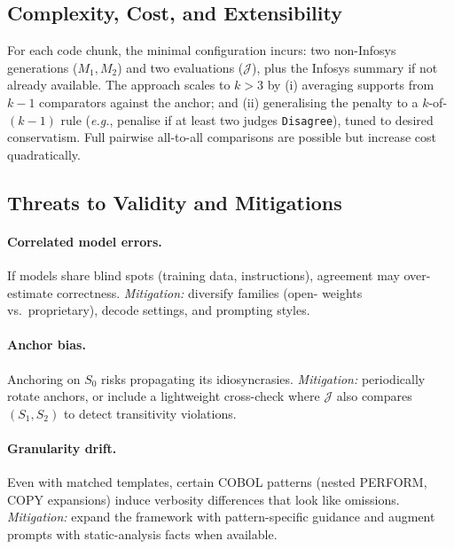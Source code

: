 \subsection{Complexity, Cost, and Extensibility}
For each code chunk, the minimal configuration incurs: two non-Infosys
generations ($M_1,M_2$) and two evaluations ($\mathcal{J}$), plus the
Infosys summary if not already available. The approach scales to $k>3$
by (i) averaging supports from $k-1$ comparators against the anchor; and
(ii) generalising the penalty to a $k$-of-$(k-1)$ rule (\emph{e.g.},
penalise if at least two judges \texttt{Disagree}), tuned to desired
conservatism. Full pairwise all-to-all comparisons are possible but
increase cost quadratically.

\subsection{Threats to Validity and Mitigations}
\paragraph{Correlated model errors.}
If models share blind spots (training data, instructions), agreement may
over-estimate correctness. \emph{Mitigation:} diversify families (open-
weights vs.\ proprietary), decode settings, and prompting styles.

\paragraph{Anchor bias.}
Anchoring on $S_0$ risks propagating its idiosyncrasies.
\emph{Mitigation:} periodically rotate anchors, or include a lightweight
cross-check where $\mathcal{J}$ also compares $(S_1,S_2)$ to detect
transitivity violations.

\paragraph{Granularity drift.}
Even with matched templates, certain COBOL patterns (nested PERFORM,
COPY expansions) induce verbosity differences that look
like omissions. \emph{Mitigation:} expand the framework with
pattern-specific guidance and augment prompts with static-analysis facts
when available.

